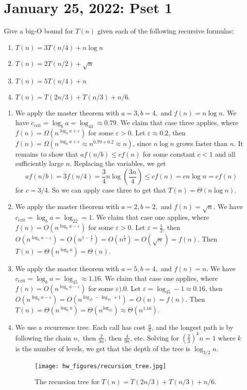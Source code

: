 \section{January 25, 2022: Pset 1} 
\begin{prob}
    Give a big-O bound for $T(n)$ given each of the following recursive formulas:
    \begin{enumerate}[label=(\alph*)]
    \setlength\itemsep{-.2em}
\item $T(n)=3T(n /4) + n \log n$ 
\item $T(n)=2T(n /2)+\sqrt{n} $
\item $T(n)=5T(n /4)+n$ 
\item $T(n)=T(2n /3)+T(n /3)+n /6.$
    \end{enumerate}
\end{prob}
\begin{solution}
    \begin{enumerate}[label=(\alph*)]
    \setlength\itemsep{-.2em}
\item We apply the master theorem with $a=3,b=4,$ and $f(n)=n \log n$. We have $c_{\mathrm{crit}}=\log_ba=\log_43\approx 0.79$. We claim that case three applies, where $f(n)=\Omega(n ^{\log_ba+\varepsilon })$ for some $\varepsilon >0$. Let $\varepsilon \approx 0.2$, then $f(n)=\Omega(n ^{\log_ba+\varepsilon }\approx n^{0.79+0.2}\approx n)$, since $n \log n$ grows faster than $n$. It remains to show that $af(n /b)\leq c f(n)$ for some constant $c<1$ and all sufficiently large $n$. Replacing the variables, we get 
    \[
        af(n /b)=3f(n /4)=\frac{3}{4}n\log\left( \frac{3n}{4} \right) \leq cf(n)=c n \log n=c f(n)
    \] for $c=3/4$. So we can apply case three to get that $T(n)=\Theta(n \log n)$.
\item We apply the master theorem with $a=2,b=2,$ and $f(n)=\sqrt{n} $. We have $c _{\mathrm{crit}}=\log_ba=\log_22=1$. We claim that case one applies, where $f(n)=O(n^{\log_ba-\varepsilon })$ for some $\varepsilon >0$. Let $\varepsilon =\frac{1}{2}$, then $O(n^{\log_ba -\varepsilon })=O(n^{1-\frac{1}{2}})=O(n^{\frac{1}{2}})=O(\sqrt{n} )=f(n)$.
    Then $T(n)=\Theta(n^{\log_ba})=\Theta(n)$.
\item We apply the master theorem with $a=5,b=4,$ and $f(n)=n$. We have $c_{\mathrm{crit}}=\log_ba=\log_45\approx 1.16$. We claim that case one applies, where $f(n)=O(n ^{\log_ba -\varepsilon })$ for some $\varepsilon ).0$. Let $\varepsilon =\log_45-1 \approx 0.16$, then $O(n^{\log_ba -\varepsilon })=O(n^{\log_45-\log_45+1})=O(n)=f(n)$. Then $T(n)=\Theta(n^{\log_ba})=\Theta(n^{\log_45})\approx\Theta(n^{1.16})$.
\item We use a recurrence tree. Each call has cost $\frac{n}{6}$, and the longest path is by following the chain $n,$ then $\frac{2}{3n}$, then $\frac{4}{9n}$, etc. Solving for $\left(\frac{2}{3}\right)^kn=1$ where $k$ is the number of levels, we get that the depth of the tree is $\log _{3 /2}n$. 
\begin{figure}[H]
\centering
 \texttt{[image: hw\_figures/recursion\_tree.jpg]}
 \caption{The recursion tree for $T(n)=T(2n /3)+T(n /3)+ n/6$.} 
 \label{recursion_tree} 
\end{figure}


\end{enumerate}
\end{solution}
